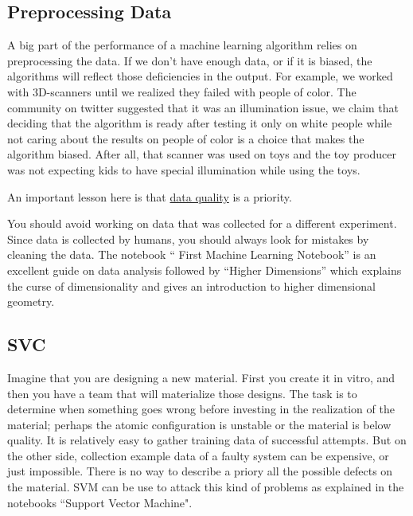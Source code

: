 \documentclass[11pt,letterpaper]{report}
\begin{document}
	\subsection{Preprocessing Data}

	
	 A big part of the performance of a machine learning algorithm relies on preprocessing the data. If we don't have enough data, or if it is biased, the algorithms will reflect those deficiencies in the output. For example, we worked with 3D-scanners until we realized they failed with people of color. The community on twitter suggested that it was an illumination issue, we claim that deciding that the algorithm is ready after testing it only on white people while not caring about the results on people of color is a choice that makes the algorithm biased. After all, that scanner was used on toys and the toy producer was not expecting kids to have special illumination while using the toys.
	 
	 An important lesson here is that \href{ https://www.quora.com/In-machine-learning-is-more-data-always-better-than-better-algorithms}{data quality} is a priority. 
	 
	  You should avoid working on data that was collected for a different experiment. Since data is collected by humans, you should always look for mistakes by cleaning the data. The  notebook `` First Machine Learning Notebook'' is an excellent guide on data analysis followed by ``Higher Dimensions'' which explains the curse of dimensionality and gives an introduction to higher dimensional geometry. 
	  
 	
	\subsection{SVC}
	Imagine that you are designing a new material. First you create it in vitro, and then you have a team that will materialize those designs. The task is to determine when something goes wrong before investing in the realization of the material;  perhaps the atomic configuration is unstable or the material is below quality. It is relatively easy to gather training data of successful attempts. But on the other side, collection example data of a faulty system  can be expensive, or just impossible. There is no way to describe a priory all the possible defects on the material. SVM can be use to attack this kind of problems as explained in the notebooks ``Support Vector Machine".
	
\end{document}
